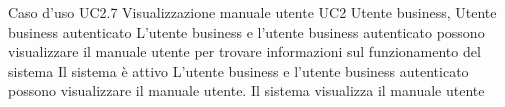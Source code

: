\UCtitle
{Caso d'uso UC2.7}
{Visualizzazione manuale utente}
\UC
{UC2}
{Utente business, Utente business autenticato}
{L'utente business e l'utente business autenticato possono visualizzare il manuale utente per trovare informazioni sul funzionamento del sistema}
{Il sistema è attivo}
\scenario
{L'utente business e l'utente business autenticato possono visualizzare il manuale utente.}
\post
{Il sistema visualizza il manuale utente}
